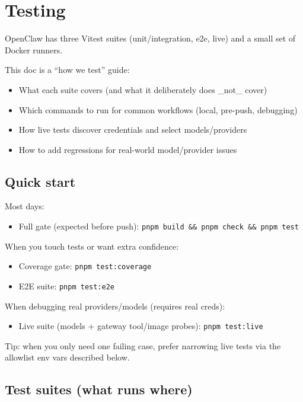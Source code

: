 \section{Testing}


OpenClaw has three Vitest suites (unit/integration, e2e, live) and a small set of Docker runners.

This doc is a “how we test” guide:

\begin{itemize}
  \item What each suite covers (and what it deliberately does \_not\_ cover)
  \item Which commands to run for common workflows (local, pre-push, debugging)
  \item How live tests discover credentials and select models/providers
  \item How to add regressions for real-world model/provider issues
\end{itemize}


\subsection{Quick start}


Most days:

\begin{itemize}
  \item Full gate (expected before push): \texttt{pnpm build \&\& pnpm check \&\& pnpm test}
\end{itemize}


When you touch tests or want extra confidence:

\begin{itemize}
  \item Coverage gate: \texttt{pnpm test:coverage}
  \item E2E suite: \texttt{pnpm test:e2e}
\end{itemize}


When debugging real providers/models (requires real creds):

\begin{itemize}
  \item Live suite (models + gateway tool/image probes): \texttt{pnpm test:live}
\end{itemize}


Tip: when you only need one failing case, prefer narrowing live tests via the allowlist env vars described below.

\subsection{Test suites (what runs where)}


